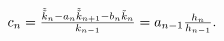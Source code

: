 $c_{n}=\frac{\tilde{\tilde{k}}_{n}-a_{n}\tilde{\tilde{k}}_{n+1}-b_{n}\tilde{k}_%
{n}}{k_{n-1}}=a_{n-1}\frac{h_{n}}{h_{n-1}}.$